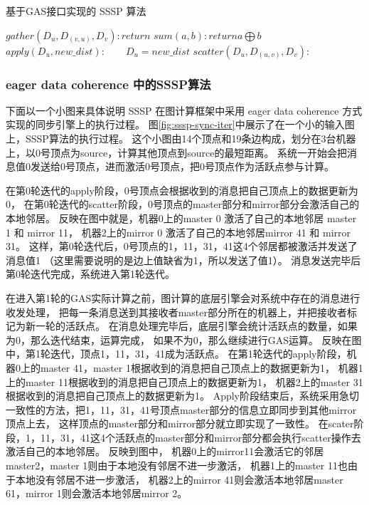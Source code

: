 \begin{algorithm}[!htbp]
  \small
  \caption{基于GAS接口实现的 SSSP 算法}\label{alg:SSSP}
  \begin{algorithmic}[1]
    \State $gather(D_u,D_{(v,u)},D_v): return$     
    \State $sum(a,b) : return a\bigoplus b $ 
    \State $apply(D_u, new\_dist): 
      \qquad D_u = new\_dist$
    \State $scatter(D_u, D_{(u,v)}, D_v):$     
    \EndIf
    \EndProcedure
  \end{algorithmic}
\end{algorithm}


\subsubsection{eager data coherence 中的SSSP算法}
下面以一个小图来具体说明 SSSP 在图计算框架中采用 eager data coherence 方式实现的同步引擎上的执行过程。
图\ref{fig:sssp-sync-iter}中展示了在一个小的输入图上，SSSP算法的执行过程。
这个小图由14个顶点和19条边构成，划分在3台机器上，以0号顶点为source，计算其他顶点到source的最短距离。
系统一开始会把消息值0发送给0号顶点，进而激活0号顶点，把0号顶点作为活跃点参与计算。

在第0轮迭代的apply阶段，0号顶点会根据收到的消息把自己顶点上的数据更新为0，
在第0轮迭代的scatter阶段，0号顶点的master部分和mirror部分会激活自己的本地邻居。
反映在图中就是，机器0上的master 0 激活了自己的本地邻居 master 1 和 mirror 11，
机器2上的mirror 0 激活了自己的本地邻居mirror 41 和 mirror 31。
这样，第0轮迭代后，0号顶点的1，11，31，41这4个邻居都被激活并发送了消息值1
（这里需要说明的是边上值缺省为1，所以发送了值1）。
消息发送完毕后第0轮迭代完成，系统进入第1轮迭代。

在进入第1轮的GAS实际计算之前，图计算的底层引擎会对系统中存在的消息进行收发处理，
把每一条消息送到其接收者master部分所在的机器上，并把接收者标记为新一轮的活跃点。
在消息处理完毕后，底层引擎会统计活跃点的数量，如果为0，那么迭代结束，运算完成，
如果不为0，那么继续进行GAS运算。
反映在图中，第1轮迭代，顶点1，11，31，41成为活跃点。
在第1轮迭代的apply阶段，机器0上的master 41，master 1根据收到的消息把自己顶点上的数据更新为1，
机器1上的master 11根据收到的消息把自己顶点上的数据更新为1，
机器2上的master 31根据收到的消息把自己顶点上的数据更新为1。
Apply阶段结束后，系统采用急切一致性的方法，把1，11，31，41号顶点master部分的信息立即同步到其他mirror顶点上去，
这样顶点的master部分和mirror部分就立即实现了一致性。
在scater阶段，1，11，31，41这4个活跃点的master部分和mirror部分都会执行scatter操作去激活自己的本地邻居。
反映到图中，
机器0上的mirror11会激活它的邻居master2，master 1则由于本地没有邻居不进一步激活，
机器1上的master 11也由于本地没有邻居不进一步激活，
机器2上的mirror 41则会激活本地邻居master 61，mirror 1则会激活本地邻居mirror 2。

